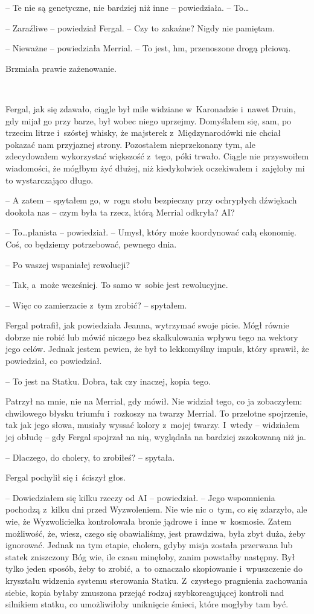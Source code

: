 \documentclass[oneside,polish,11pt,sfheadings]{mwbk}
\begin{document}
-- Te nie są genetyczne, nie bardziej niż inne -- powiedziała. -- To\ldots

-- Zaraźliwe -- powiedział Fergal. -- Czy to zakaźne? Nigdy nie pamiętam.

-- Nieważne -- powiedziała Merrial. -- To jest, hm, przenoszone drogą
płciową.

Brzmiała prawie zażenowanie.

~

Fergal, jak się zdawało, ciągle był mile widziane w~Karonadzie i~nawet
Druin, gdy mijał go przy barze, był wobec niego uprzejmy. Domyślałem
się, sam, po trzecim litrze i~szóstej whisky, że majsterek z~Międzynarodówki nie chciał pokazać nam przyjaznej strony. Pozostałem
nieprzekonany tym, ale zdecydowałem wykorzystać większość z~tego, póki
trwało. Ciągle nie przyswoiłem wiadomości, że mógłbym żyć dłużej, niż
kiedykolwiek oczekiwałem i~zajęłoby mi to wystarczająco długo.

-- A zatem -- spytałem go, w~rogu stołu bezpieczny przy ochrypłych
dźwiękach dookoła nas -- czym była ta rzecz, którą Merrial odkryła? AI?

-- To\ldots planista -- powiedział. -- Umysł, który może koordynować całą
ekonomię. Coś, co będziemy potrzebować, pewnego dnia.

-- Po waszej wspaniałej rewolucji?

-- Tak, a~może wcześniej. To samo w~sobie jest rewolucyjne.

-- Więc co zamierzacie z~tym zrobić? -- spytałem.

Fergal potrafił, jak powiedziała Jeanna, wytrzymać swoje picie. Mógł
równie dobrze nie robić lub mówić niczego bez skalkulowania wpływu tego
na wektory jego celów. Jednak jestem pewien, że był to lekkomyślny
impuls, który sprawił, że powiedział, co powiedział.

-- To jest na Statku. Dobra, tak czy inaczej, kopia tego.

Patrzył na mnie, nie na Merrial, gdy mówił. Nie widział tego, co ja
zobaczyłem: chwilowego błysku triumfu i~rozkoszy na twarzy Merrial. To
przelotne spojrzenie, tak jak jego słowa, musiały wyssać kolory z~mojej
twarzy. I~wtedy -- widziałem jej obłudę -- gdy Fergal spojrzał na nią,
wyglądała na bardziej zszokowaną niż ja.

-- Dlaczego, do cholery, to zrobiłeś? -- spytała.

Fergal pochylił się i~ściszył głos. 

-- Dowiedziałem się kilku rzeczy od
AI -- powiedział. -- Jego wspomnienia pochodzą z~kilku dni przed
Wyzwoleniem. Nie wie nic o~tym, co się zdarzyło, ale wie, że
Wyzwolicielka kontrolowała bronie jądrowe i~inne w~kosmosie. Zatem
możliwość, że, wiesz, czego się obawialiśmy, jest prawdziwa, była zbyt
duża, żeby ignorować. Jednak na tym etapie, cholera, gdyby misja została
przerwana lub statek zniszczony Bóg wie, ile czasu minęłoby, zanim
powstałby następny. Był tylko jeden sposób, żeby to zrobić, a~to
oznaczało skopiowanie i~wpuszczenie do kryształu widzenia systemu
sterowania Statku. Z~czystego pragnienia zachowania siebie, kopia byłaby
zmuszona przejąć rodzaj szybkoreagującej kontroli nad silnikiem statku,
co umożliwiłoby uniknięcie śmieci, które mogłyby tam być.
\end{document}
